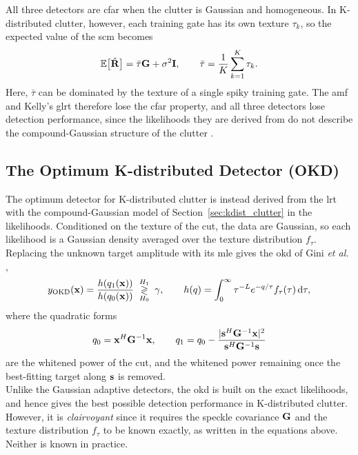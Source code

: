 \documentclass[12pt, a4paper]{report}
\begin{document}
All three detectors are \gls{cfar} when the clutter is Gaussian and homogeneous. In K-distributed clutter, however, each training gate has its own texture $\tau_k$, so the expected value of the \gls{scm} becomes
\begin{equation}
    \mathbb{E}\big[\hat{\mathbf{R}}\big] = \bar\tau\mathbf{G} + \sigma^2\mathbf{I},
    \qquad \bar\tau = \frac{1}{K}\sum_{k=1}^{K}\tau_k.
\end{equation}
Here, $\bar\tau$ can be dominated by the texture of a single spiky training gate. The \gls{amf} and Kelly's \gls{glrt} therefore lose the \gls{cfar} property, and all three detectors lose detection performance, since the likelihoods they are derived from do not describe the compound-Gaussian structure of the clutter \cite{Rosenberg2017}. \\

\subsection{The Optimum K-distributed Detector (OKD)}
\label{sec:okd}
The optimum detector for K-distributed clutter is instead derived from the \gls{lrt} with the compound-Gaussian model of Section~\ref{sec:kdist_clutter} in the likelihoods. Conditioned on the texture of the \gls{cut}, the data are Gaussian, so each likelihood is a Gaussian density averaged over the texture distribution $f_\tau$. Replacing the unknown target amplitude with its \gls{mle} gives the \gls{okd} of Gini \textit{et al.} \cite{Gini1998},
\begin{equation}
    y_\text{OKD}(\vb x) = \frac{h(q_1(\vb x))}{h(q_0(\vb x))} \;\underset{H_0}{\overset{H_1}{\gtrless}}\; \gamma,
    \qquad
    h(q) = \int_0^\infty \tau^{-L} e^{-q/\tau} f_\tau(\tau)\,\mathrm{d}\tau,
    \label{eq:okd}
\end{equation}
where the quadratic forms
\begin{equation}
    q_0 = \vb x^H\mathbf{G}^{-1}\vb x,
    \qquad
    q_1 = q_0 - \frac{|\vb s^H\mathbf{G}^{-1}\vb x|^2}{\vb s^H\mathbf{G}^{-1}\vb s}
    \label{eq:q0q1}
\end{equation}
are the whitened power of the \gls{cut}, and the whitened power remaining once the best-fitting target along $\vb s$ is removed. \\

Unlike the Gaussian adaptive detectors, the \gls{okd} is built on the exact likelihoods, and hence gives the best possible detection performance in K-distributed clutter. However, it is \emph{clairvoyant} since it requires the speckle covariance $\mathbf{G}$ and the texture distribution $f_\tau$ to be known exactly, as written in the equations above. Neither is known in practice.\\
\end{document}
